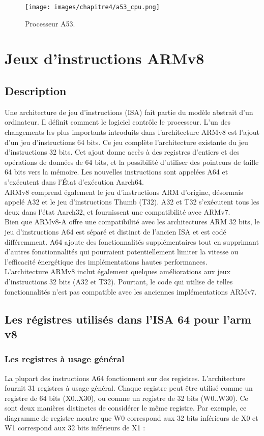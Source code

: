 \documentclass[12pt,a4paper,oneside]{book}
\begin{document}
	\begin{figure}[H]
		\centering
		\texttt{[image: images/chapitre4/a53\_cpu.png]}
		\caption{Processeur A53.}
		\label{Types}
	\end{figure}
	
	\section{Jeux d'instructions ARMv8}
	\subsection{Description}
	Une architecture de jeu d'instructions (ISA) fait partie du modèle abstrait d'un ordinateur. Il définit comment le logiciel contrôle le processeur.
	L'un des changements les plus importants introduits dans l'architecture ARMv8 est l'ajout d'un jeu d'instructions 64 bits. Ce jeu complète l'architecture existante du jeu d'instructions 32 bits. Cet ajout donne accès à des registres d'entiers et des opérations de données de 64 bits, et la possibilité d'utiliser des pointeurs de taille 64 bits vers la mémoire. Les nouvelles instructions sont appelées A64 et s'exécutent dans l'État d'exécution Aarch64.\\
	ARMv8 comprend également le jeu d'instructions ARM d'origine, désormais appelé A32 et le jeu d'instructions Thumb (T32). A32 et T32 s'exécutent tous les deux dans l'état Aarch32, et fournissent une compatibilité avec ARMv7.\\
	Bien que ARMv8-A offre une compatibilité avec les architectures ARM 32 bits, le jeu d'instructions A64 est séparé et distinct de l'ancien ISA et est codé différemment. A64 ajoute des fonctionnalités supplémentaires tout en supprimant d'autres fonctionnalités qui pourraient potentiellement limiter la vitesse ou l'efficacité énergétique des implémentations hautes performances.\\ L'architecture ARMv8 inclut également quelques améliorations aux jeux d'instructions 32 bits (A32 et T32). Pourtant, le code qui utilise de telles fonctionnalités n'est pas compatible avec les anciennes implémentations ARMv7.
	
	\subsection{Les régistres  utilisés  dans l'ISA 64 pour l'arm v8}
	\subsubsection{Les registres à usage général}
	La plupart des instructions A64 fonctionnent sur des registres. L'architecture fournit 31 registres à usage général. Chaque registre peut être utilisé comme un registre de 64 bits (X0..X30), ou comme un registre de 32 bits (W0..W30). Ce sont deux manières distinctes de considérer le même registre. Par exemple, ce diagramme de registre montre que W0 correspond aux 32 bits inférieurs de X0 et W1 correspond aux 32 bits inférieurs de X1 :
\end{document}
